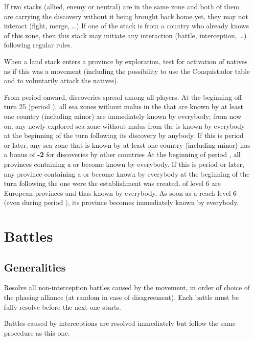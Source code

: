 If two stacks (allied, enemy or neutral) are in the same zone and both of them
are carrying the discovery without it being brought back home yet, they may
not interact (fight, merge, \ldots) If one of the stack is from a country who
already knows of this zone, then this stack may initiate any interaction
(battle, interception, \ldots) following regular rules.

When a land stack enters a province by exploration, test for activation of
natives as if this was a movement (including the possibility to use the
Conquistador table and to voluntarily attack the natives).

\bparag From period  onward, discoveries spread among all players.
\bparag[Atlantic] At the beginning off turn 25 (period ), all sea
zones without malus in the  that are known by at least one
country (including minor) are immediately known by everybody; from now on, any
newly explored sea zone without malus from the  is known by
everybody at the beginning of the turn following its discovery by anybody.
\bparag[On sea] If this is period  or later, any sea zone that is
known by at least one country (including minor) has a bonus of {\bf -2} for
discoveries by other countries
\bparag [On land] At the beginning of period , all provinces
containing a \COL or \TP become known by everybody.
\bparag [On land] If this is period  or later, any province
containing a \COL or \TP become known by everybody at the beginning of the
turn following the one were the establishment was created.
\bparag[Level 6] \COL of level 6 are European provinces and thus known by
everybody. As soon as a \COL reach level 6 (even during period ),
its province becomes immediately known by everybody.

\section{Battles}
\label{chMilitary:Battles}
\subsection{Generalities}
Resolve all non-interception battles caused by the movement, in order of
choice of the phasing alliance (at random in case of disagreement). Each
battle must be fully resolve before the next one starts.

Battles caused by interceptions are resolved immediately but follow the same
procedure as this one.

